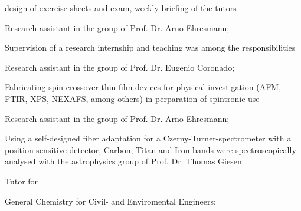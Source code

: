 \begin{adjustwidth}{2.5cm}{1.9cm}
\begin{tightemize}
design of exercise sheets and exam, weekly briefing of the tutors %
\end{tightemize}
\begin{tightemize} \vspace{-3pt}
\item Research assistant in the group of Prof. Dr. Arno Ehresmann;

Supervision of a research internship and teaching was among the responsibilities
\end{tightemize}
\begin{tightemize} \vspace{-3pt}
\item Research assistant in the group of Prof. Dr. Eugenio Coronado;

Fabricating spin-crossover thin-film devices for physical investigation (AFM, FTIR, XPS, NEXAFS, among others) in perparation of spintronic use  
\end{tightemize}
\begin{tightemize} \vspace{-3pt}
\item Research assistant in the group of Prof. Dr. Arno Ehresmann;

Using a self-designed fiber adaptation for a Czerny-Turner-spectrometer with a position sensitive detector, Carbon, Titan and Iron bands were spectroscopically analysed with the astrophysics group of Prof. Dr. Thomas Giesen
\end{tightemize}
\begin{tightemize} \vspace{-3pt}
\item Tutor for \begin{em}General Chemistry for Civil- and Enviromental Engineers;
\end{em}


\end{tightemize}
\end{adjustwidth}
